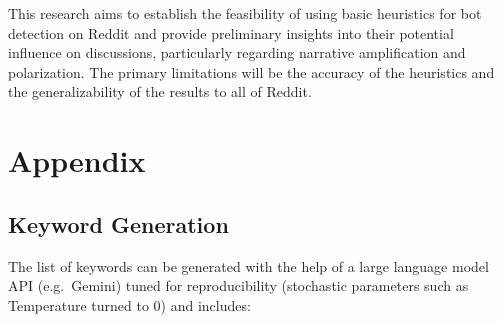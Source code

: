 \documentclass[
  letterpaper,
  DIV=11,
  numbers=noendperiod]{scrartcl}
\begin{document}
This research aims to establish the feasibility of using basic
heuristics for bot detection on Reddit and provide preliminary insights
into their potential influence on discussions, particularly regarding
narrative amplification and polarization. The primary limitations will
be the accuracy of the heuristics and the generalizability of the
results to all of Reddit.

\newpage

\section{Appendix}\label{appendix}

\subsection{Keyword Generation}\label{keyword-generation}

The list of keywords can be generated with the help of a large language
model API (e.g.~Gemini) tuned for reproducibility (stochastic parameters
such as Temperature turned to 0) and includes:
\end{document}
